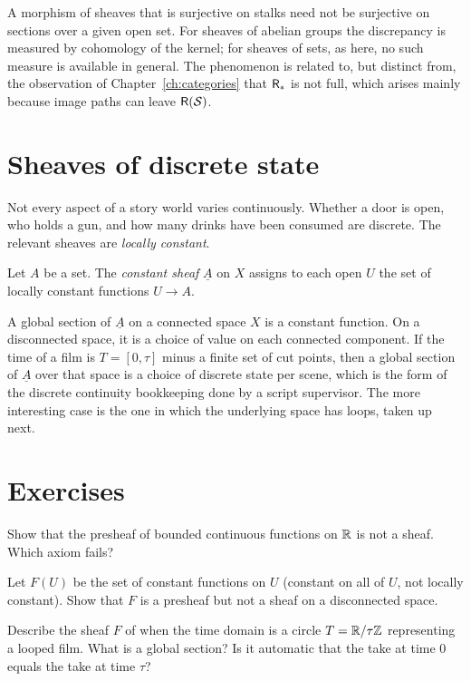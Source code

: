 \begin{remark}
A morphism of sheaves that is surjective on stalks need not be surjective on sections over a given open set. For sheaves of abelian groups the discrepancy is measured by cohomology of the kernel; for sheaves of sets, as here, no such measure is available in general. The phenomenon is related to, but distinct from, the observation of Chapter~\ref{ch:categories} that $\mathsf{R}_*$ is not full, which arises mainly because image paths can leave $\mathsf{R}(\mathcal{S})$.
\end{remark}

\section{Sheaves of discrete state}

Not every aspect of a story world varies continuously. Whether a door is open, who holds a gun, and how many drinks have been consumed are discrete. The relevant sheaves are \emph{locally constant}.

\begin{definition}
Let $A$ be a set. The \emph{constant sheaf} $\underline{A}$ on $X$ assigns to each open $U$ the set of locally constant functions $U\to A$.
\end{definition}

A global section of $\underline{A}$ on a connected space $X$ is a constant function. On a disconnected space, it is a choice of value on each connected component. If the time of a film is $T=[0,\tau]$ minus a finite set of cut points, then a global section of $\underline{A}$ over that space is a choice of discrete state per scene, which is the form of the discrete continuity bookkeeping done by a script supervisor. The more interesting case is the one in which the underlying space has loops, taken up next.

\section*{Exercises}

\begin{exercise}
Show that the presheaf of bounded continuous functions on $\mathbb{R}$ is not a sheaf. Which axiom fails?
\end{exercise}

\begin{exercise}
Let $F(U)$ be the set of constant functions on $U$ (constant on all of $U$, not locally constant). Show that $F$ is a presheaf but not a sheaf on a disconnected space.
\end{exercise}

\begin{exercise}
Describe the sheaf $F$ of  when the time domain is a circle $T=\mathbb{R}/\tau\mathbb{Z}$ representing a looped film. What is a global section? Is it automatic that the take at time $0$ equals the take at time $\tau$?
\end{exercise}
